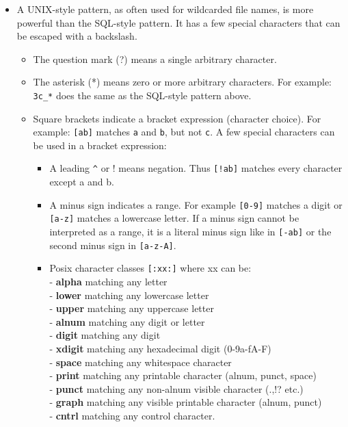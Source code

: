 \begin{itemize}
\item A UNIX-style pattern, as often used for wildcarded file names, is
  more powerful than the SQL-style pattern. It has a few
  special characters that can be escaped with a backslash.
  \begin{itemize}
  \item The question mark (?) means a single arbitrary character.
  \item The asterisk (*) means zero or more arbitrary characters.
    For example: \texttt{3c\_*}
    does the same as the SQL-style pattern above.
  \item Square brackets indicate a bracket expression (character choice).
    For example: \texttt{[ab]} matches \texttt{a} and
    \texttt{b}, but not \texttt{c}.
    A few special characters can be used in a bracket expression:
    \begin{itemize}
    \item A leading \verb+^+ or ! means negation. Thus
      \texttt{[!ab]} matches every character except a and b.
    \item A minus sign indicates a range. For example
      \texttt{[0-9]} matches a digit or \texttt{[a-z]} matches a
      lowercase letter. If a minus sign cannot be interpreted as a
      range, it is a literal minus sign like in \texttt{[-ab]} or the
      second minus sign in \texttt{[a-z-A]}.
    \item Posix character classes \texttt{[:xx:]} where xx can be:
      \\- \textbf{alpha} matching any letter
      \\- \textbf{lower} matching any lowercase letter
      \\- \textbf{upper} matching any uppercase letter
      \\- \textbf{alnum} matching any digit or letter
      \\- \textbf{digit} matching any digit
      \\- \textbf{xdigit} matching any hexadecimal digit (0-9a-fA-F)
      \\- \textbf{space} matching any whitespace character
      \\- \textbf{print} matching any printable character (alnum,
      punct, space)
      \\- \textbf{punct} matching any non-alnum visible character
      (.,!? etc.)
      \\- \textbf{graph} matching any visible printable character (alnum, punct)
      \\- \textbf{cntrl} matching any control character.

\end{itemize}
\end{itemize}
\end{itemize}
